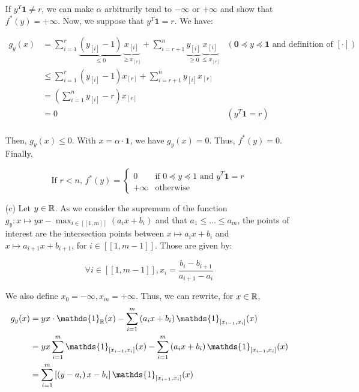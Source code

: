 \documentclass[a4paper, 11pt]{report}
\begin{document}
\begin{itemize}
    If $y^{T}\mathbf{1} \neq r$, we can make $\alpha$ arbitrarily tend to $- \infty$ or $+ \infty$ and show that $f^{*}(y) = + \infty$. Now, we suppose that $y^{T}\mathbf{1} = r$. We have:
    
    \begin{equation*}
        \begin{aligned}
            g_{y}(x) &= \sum_{i=1}^{r} \underbrace{(y_{[i]} - 1)}_{\leq 0} \underbrace{x_{[i]}}_{\geq x_{[r]}} + \sum_{i=r+1}^{n} \underbrace{y_{[i]}}_{\geq 0} \underbrace{x_{[i]}}_{\leq x_{[r]}} &(\mathbf{0} \preceq y \preceq \mathbf{1} \text{ and definition of $[\cdot]$}) \\
            &\leq \sum_{i=1}^{r} (y_{[i]} - 1) x_{[r]} + \sum_{i=r+1}^{n} y_{[i]} x_{[r]} \\
            &= \left( \sum_{i=1}^{n} y_{[i]} - r \right) x_{[r]} \\
            &= 0 &(y^{T}\mathbf{1} = r) \\
        \end{aligned}
    \end{equation*}
    
    Then, $g_{y}(x) \leq 0$. With $x = \alpha \cdot \mathbf{1}$, we have $g_{y}(x) = 0$. Thus, $f^{*}(y) = 0$. Finally,
    
    \[ \boxed{\text{If $r < n$, } f^{*}(y) = \begin{cases}
        0        & \text{if } 0 \preceq y \preceq 1 \text{ and } y^{T}\mathbf{1} = r \\
        + \infty & \text{otherwise }
    \end{cases}} \]
    
    \item[(c)] Let $y \in \mathbb{R}$. As we consider the supremum of the function $g_{y}: x \mapsto yx - \max_{i \in [\![ 1, m ]\!]} \left( a_{i}x + b_{i} \right)$ and that $a_{1} \leq \dots \leq a_{m}$, the points of interest are the intersection points between $x \mapsto a_{i}x + b_{i}$ and $x \mapsto a_{i+1}x + b_{i+1}$, for $i \in [\![ 1, m-1 ]\!]$. Those are given by:
    
    \[ \forall i \in [\![ 1, m-1 ]\!], x_{i} = \frac{b_{i} - b_{i+1}}{a_{i+1} - a_{i}} \]
    
    We also define $x_{0} = - \infty, x_{m} = + \infty$. Thus, we can rewrite, for $x \in \mathbb{R}$,
    \begin{equation*}
        \begin{split}
            g_{y}(x) &= yx \cdot \mathds{1}_{\R}(x) - \sum_{i=1}^{m} \left( a_{i}x + b_{i} \right) \mathds{1}_{[x_{i-1}, x_{i}]}(x) \\
             &= yx \sum_{i=1}^{m} \mathds{1}_{[x_{i-1}, x_{i}]}(x) - \sum_{i=1}^{m} \left( a_{i}x + b_{i} \right) \mathds{1}_{[x_{i-1}, x_{i}]}(x) \\
             &= \sum_{i=1}^{m} \left[ \left( y - a_{i} \right)x - b_{i} \right] \mathds{1}_{[x_{i-1}, x_{i}]}(x)
        \end{split}
    \end{equation*}
    

\end{itemize}
\end{document}
